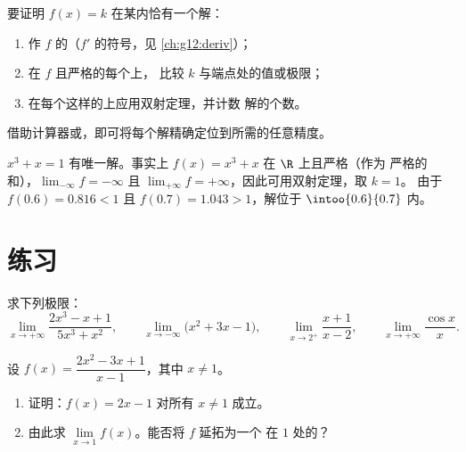 \begin{method}[用双射定理求解 $f(x) = k$]\label{met:g12:limcont:bijection}
要证明 $f(x) = k$ 在某内恰有一个解：
\begin{enumerate}
  \item 作 $f$ 的（$f'$ 的符号，见
        \cref{ch:g12:deriv}）；
  \item 在 $f$ 且严格的每个上，
        比较 $k$ 与端点处的值或极限；
  \item 在每个这样的上应用双射定理，并计数
        解的个数。
\end{enumerate}
借助计算器或，即可将每个解精确定位到所需的任意精度。
\end{method}

\begin{example}\label{ex:g12:limcont:cubic}
 $x^3 + x = 1$ 有唯一解。事实上
$f(x) = x^3 + x$ 在 $\R$ 上且严格（作为
严格的和），$\lim_{-\infty} f = -\infty$ 且
$\lim_{+\infty} f = +\infty$，因此可用双射定理，取 $k = 1$。
由于 $f(0.6) = 0.816 < 1$ 且 $f(0.7) = 1.043 > 1$，解位于
$\intoo{0.6}{0.7}$ 内。
\end{example}

\section{练习}

\begin{exercise}[$\star$]\label{exo:g12:limcont:1}
求下列极限：
\[
\lim_{x\to+\infty} \frac{2x^3 - x + 1}{5x^3 + x^2}, \qquad
\lim_{x\to-\infty} \bigl(x^2 + 3x - 1\bigr), \qquad
\lim_{x\to 2^+} \frac{x+1}{x-2}, \qquad
\lim_{x\to+\infty} \frac{\cos x}{x}.
\]
\end{exercise}

\begin{exercise}[$\star$]\label{exo:g12:limcont:2}
设 $f(x) = \dfrac{2x^2 - 3x + 1}{x - 1}$，其中 $x \neq 1$。
\begin{enumerate}
  \item 证明：$f(x) = 2x - 1$ 对所有 $x \neq 1$ 成立。
  \item 由此求 $\lim\limits_{x \to 1} f(x)$。能否将 $f$ 延拓为一个
        在 $1$ 处的？
\end{enumerate}
\end{exercise}

